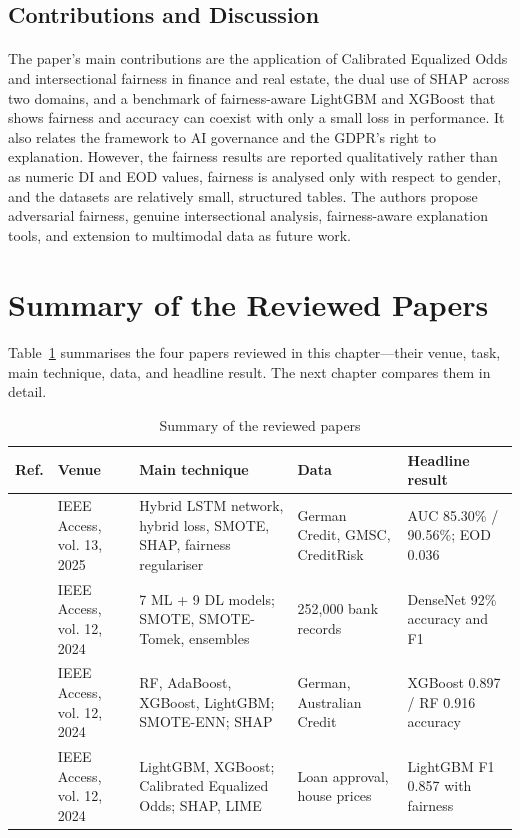 \documentclass[12pt,a4paper,final]{extreport}
\begin{document}
\subsection{Contributions and Discussion}

\paragraph{} The paper's main contributions are the application of Calibrated Equalized Odds and intersectional fairness in finance and real estate, the dual use of SHAP across two domains, and a benchmark of fairness-aware LightGBM and XGBoost that shows fairness and accuracy can coexist with only a small loss in performance. It also relates the framework to AI governance and the GDPR's right to explanation. However, the fairness results are reported qualitatively rather than as numeric DI and EOD values, fairness is analysed only with respect to gender, and the datasets are relatively small, structured tables. The authors propose adversarial fairness, genuine intersectional analysis, fairness-aware explanation tools, and extension to multimodal data as future work.

\section{Summary of the Reviewed Papers}

\paragraph{} Table~\ref{tab:summary} summarises the four papers reviewed in this chapter---their venue, task, main technique, data, and headline result. The next chapter compares them in detail.

{\renewcommand{\arraystretch}{1.2}
\begin{table}[htbp]
\centering
\caption{Summary of the reviewed papers}\label{tab:summary}
\small
\begin{tabularx}{\textwidth}{|p{0.85cm}|p{2.1cm}|X|p{2.7cm}|X|}
\hline
\textbf{Ref.} & \textbf{Venue} & \textbf{Main technique} & \textbf{Data} & \textbf{Headline result} \\ \hline
\cite{p1} & IEEE Access, vol. 13, 2025 & Hybrid LSTM network, hybrid loss, SMOTE, SHAP, fairness regulariser & German Credit, GMSC, CreditRisk & AUC 85.30\% / 90.56\%; EOD 0.036 \\ \hline
\cite{p2} & IEEE Access, vol. 12, 2024 & 7 ML + 9 DL models; SMOTE, SMOTE-Tomek, ensembles & 252{,}000 bank records & DenseNet 92\% accuracy and F1 \\ \hline
\cite{p3} & IEEE Access, vol. 12, 2024 & RF, AdaBoost, XGBoost, LightGBM; SMOTE-ENN; SHAP & German, Australian Credit & XGBoost 0.897 / RF 0.916 accuracy \\ \hline
\cite{p4} & IEEE Access, vol. 12, 2024 & LightGBM, XGBoost; Calibrated Equalized Odds; SHAP, LIME & Loan approval, house prices & LightGBM F1 0.857 with fairness \\ \hline
\end{tabularx}
\end{table}}
\end{document}

